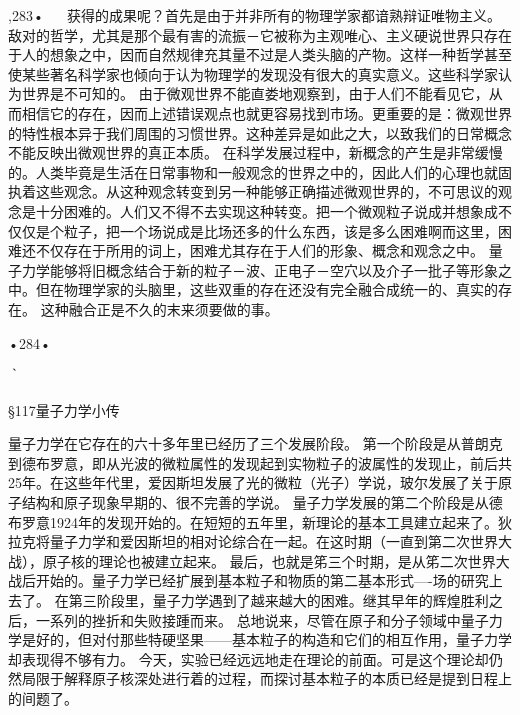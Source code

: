 ,283•
  
获得的成果呢？首先是由于并非所有的物理学家都谙熟辩证唯物主义。敌对的哲学，尤其是那个最有害的流振－它被称为主观唯心、主义硬说世界只存在于人的想象之中，因而自然规律充其量不过是人类头脑的产物。这样一种哲学甚至使某些著名科学家也倾向于认为物理学的发现没有很大的真实意义。这些科学家认为世界是不可知的。
由于微观世界不能直娄地观察到，由于人们不能看见它，从而相信它的存在，因而上述错误观点也就更容易找到市场。更重要的是：微观世界的特性根本异于我们周围的习惯世界。这种差异是如此之大，以致我们的日常概念不能反映出微观世界的真正本质。
在科学发展过程中，新概念的产生是非常缓慢的。人类毕竟是生活在日常事物和一般观念的世界之中的，因此人们的心理也就固执着这些观念。从这种观念转变到另一种能够正确描述微观世界的，不可思议的观念是十分困难的。人们又不得不去实现这种转变。把一个微观粒子说成并想象成不仅仅是个粒子，把一个场说成是比场还多的什么东西，该是多么困难啊而这里，困难还不仅存在于所用的词上，困难尤其存在于人们的形象、概念和观念之中。
量子力学能够将旧概念结合于新的粒子－波、正电子－空穴以及介子一批子等形象之中。但在物理学家的头脑里，这些双重的存在还没有完全融合成统一的、真实的存在。
这种融合正是不久的末来须要做的事。

•284•
  

｀
 
§117量子力学小传

量子力学在它存在的六十多年里已经历了三个发展阶段。
第一个阶段是从普朗克到德布罗意，即从光波的微粒属性的发现起到实物粒子的波属性的发现止，前后共25年。在这些年代里，爱因斯坦发展了光的微粒（光子）学说，玻尔发展了关于原子结构和原子现象早期的、很不完善的学说。
量子力学发展的第二个阶段是从德布罗意1924年的发现开始的。在短短的五年里，新理论的基本工具建立起来了。狄拉克将量子力学和爱因斯坦的相对论综合在一起。在这时期（一直到第二次世界大战），原子核的理论也被建立起来。
最后，也就是笫三个时期，是从笫二次世界大战后开始的。量子力学已经扩展到基本粒子和物质的第二基本形式—-场的研究上去了。
在第三阶段里，量子力学遇到了越来越大的困难。继其早年的辉煌胜利之后，一系列的挫折和失败接踵而来。
总地说来，尽管在原子和分子领域中量子力学是好的，但对付那些特硬坚果——基本粒子的构造和它们的相互作用，量子力学却表现得不够有力。
今天，实验已经远远地走在理论的前面。可是这个理论却仍然局限于解释原子核深处进行着的过程，而探讨基本粒子的本质已经是提到日程上的间题了。

